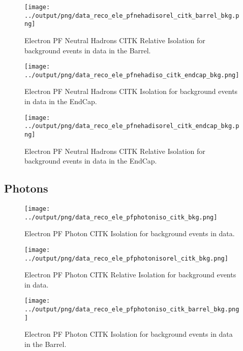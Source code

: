 \documentclass[11pt]{book}
\begin{document}
\begin{figure}[htb]
\centering
\texttt{[image: ../output/png/data\_reco\_ele\_pfnehadisorel\_citk\_barrel\_bkg.png]}
\caption{Electron PF Neutral Hadrons CITK Relative Isolation for background events in data in the Barrel.}
\label{fig:data_ele_pfnehadisorel_citk_barrel_bkg}
\end{figure}

\begin{figure}[htb]
\centering
\texttt{[image: ../output/png/data\_reco\_ele\_pfnehadiso\_citk\_endcap\_bkg.png]}
\caption{Electron PF Neutral Hadrons CITK Isolation for background events in data in the EndCap.}
\label{fig:data_ele_pfnehadiso_citk_endcap_bkg}
\end{figure}

\begin{figure}[htb]
\centering
\texttt{[image: ../output/png/data\_reco\_ele\_pfnehadisorel\_citk\_endcap\_bkg.png]}
\caption{Electron PF Neutral Hadrons CITK Relative Isolation for background events in data in the EndCap.}
\label{fig:data_ele_pfnehadisorel_citk_endcap_bkg}
\end{figure}
\clearpage

\subsection{Photons}
\begin{figure}[htb]
\centering
\texttt{[image: ../output/png/data\_reco\_ele\_pfphotoniso\_citk\_bkg.png]}
\caption{Electron PF Photon CITK Isolation for background events in data.}
\label{fig:data_ele_pfphotoniso_citk_bkg}
\end{figure}

\begin{figure}[htb]
\centering
\texttt{[image: ../output/png/data\_reco\_ele\_pfphotonisorel\_citk\_bkg.png]}
\caption{Electron PF Photon CITK Relative Isolation for background events in data.}
\label{fig:data_ele_pfphotonisorel_citk_bkg}
\end{figure}

\begin{figure}[htb]
\centering
\texttt{[image: ../output/png/data\_reco\_ele\_pfphotoniso\_citk\_barrel\_bkg.png]}
\caption{Electron PF Photon CITK Isolation for background events in data in the Barrel.}
\label{fig:data_ele_pfphotoniso_citk_barrel_bkg}
\end{figure}
\end{document}
